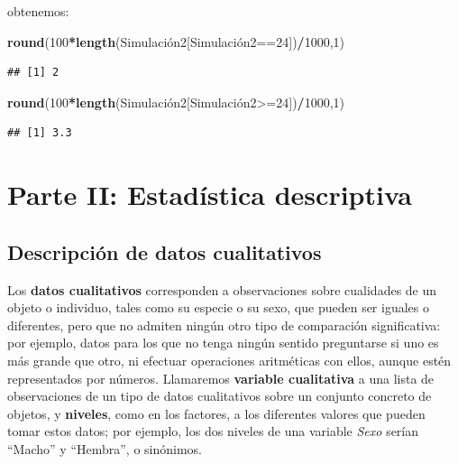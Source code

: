 \documentclass[]{book}
\newenvironment{Shaded}{\begin{snugshade}}{\end{snugshade}}
\newcommand{\DecValTok}[1]{\textcolor[rgb]{0.00,0.00,0.81}{#1}}
\newcommand{\KeywordTok}[1]{\textcolor[rgb]{0.13,0.29,0.53}{\textbf{#1}}}
\newcommand{\NormalTok}[1]{#1}
\newcommand{\OperatorTok}[1]{\textcolor[rgb]{0.81,0.36,0.00}{\textbf{#1}}}
\theoremstyle{definition}
\theoremstyle{definition}
\theoremstyle{definition}
\theoremstyle{remark}
\begin{document}
obtenemos:

\begin{Shaded}
\begin{Highlighting}[]
\KeywordTok{round}\NormalTok{(}\DecValTok{100}\OperatorTok{*}\KeywordTok{length}\NormalTok{(Simulación2[Simulación2==}\DecValTok{24}\NormalTok{])}\OperatorTok{/}\DecValTok{1000}\NormalTok{,}\DecValTok{1}\NormalTok{)}
\end{Highlighting}
\end{Shaded}

\begin{verbatim}
## [1] 2
\end{verbatim}

\begin{Shaded}
\begin{Highlighting}[]
\KeywordTok{round}\NormalTok{(}\DecValTok{100}\OperatorTok{*}\KeywordTok{length}\NormalTok{(Simulación2[Simulación2>=}\DecValTok{24}\NormalTok{])}\OperatorTok{/}\DecValTok{1000}\NormalTok{,}\DecValTok{1}\NormalTok{)}
\end{Highlighting}
\end{Shaded}

\begin{verbatim}
## [1] 3.3
\end{verbatim}

\hypertarget{part-parte-ii-estadistica-descriptiva}{%
\part*{Parte II: Estadística descriptiva}\label{part-parte-ii-estadistica-descriptiva}}

\hypertarget{chap:edqual}{%
\chapter{Descripción de datos cualitativos}\label{chap:edqual}}

Los \textbf{datos cualitativos} corresponden a observaciones sobre cualidades de un objeto o individuo, tales como su especie o su sexo, que pueden ser iguales o diferentes, pero que no admiten ningún otro tipo de comparación significativa: por ejemplo, datos para los que no tenga ningún sentido preguntarse si uno es más grande que otro, ni efectuar operaciones aritméticas con ellos, aunque estén representados por números. Llamaremos \textbf{variable cualitativa} a una lista de observaciones de un tipo de datos cualitativos sobre un conjunto concreto de objetos, y \textbf{niveles}, como en los factores, a los diferentes valores que pueden tomar estos datos; por ejemplo, los dos niveles de una variable \emph{Sexo} serían ``Macho'' y ``Hembra'', o sinónimos.
\end{document}
